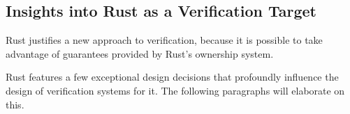 \documentclass[twoside, english]{sdqthesis}
\theoremstyle{definition}
\begin{document}




\subsection{Insights into Rust as a Verification Target}

Rust justifies a new approach to verification, because it is possible to take advantage of guarantees provided by Rust's ownership system. 



Rust features a few exceptional design decisions that profoundly influence the design of verification systems for it. The following paragraphs will elaborate on this.
\end{document}
